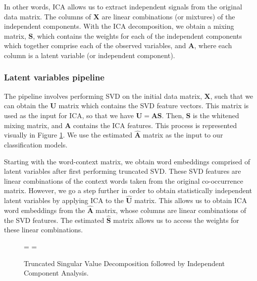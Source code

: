 \documentclass{article}
\begin{document}
In other words, ICA allows us to extract independent signals from the
original data matrix. The columns of \(\mathbf{X}\) are linear
combinations (or mixtures) of the independent components. With the ICA
decomposition, we obtain a mixing matrix, \(\mathbf{S}\), which contains
the weights for each of the independent components which together
comprise each of the observed variables, and \(\mathbf{A}\), where each
column is a latent variable (or independent component).

\hypertarget{latent-variables-pipeline}{%
\subsubsection{Latent variables
pipeline}\label{latent-variables-pipeline}}

\label{sec:LVpipe} The pipeline involves performing SVD on the initial
data matrix, \(\mathbf{X}\), such that we can obtain the \(\mathbf{U}\)
matrix which contains the SVD feature vectors. This matrix is used as
the input for ICA, so that we have \(\mathbf{U = AS}\). Then,
\(\mathbf{S}\) is the whitened mixing matrix, and \(\mathbf{A}\)
contains the ICA features. This process is represented visually in
Figure \ref{fig:matdec}. We use the estimated \(\mathbf{\hat{A}}\)
matrix as the input to our classification models.

Starting with the word-context matrix, we obtain word embeddings
comprised of latent variables after first performing truncated SVD.
These SVD features are linear combinations of the context words taken
from the original co-occurrence matrix. However, we go a step further in
order to obtain statistically independent latent variables by applying
ICA to the \(\mathbf{\hat{U}}\) matrix. This allows us to obtain ICA
word embeddings from the \(\mathbf{\hat{A}}\) matrix, whose columns are
linear combinations of the SVD features. The estimated
\(\mathbf{\hat{S}}\) matrix allows us to access the weights for these
linear combinations.

\begin{figure}
  \centering
   = 
   
  \newline
  \newline
  \newline
   = 
   
  \caption{Truncated Singular Value Decomposition followed by Independent Component Analysis.}
  \label{fig:matdec}
\end{figure}
\end{document}
